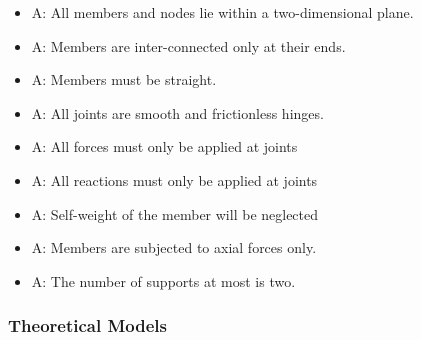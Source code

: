 \documentclass[12pt]{article}
\newcounter{assumpnum} %
\begin{document}
\begin{itemize}

\item{A\theassumpnum \label{planar}: All members and nodes lie within a two-dimensional plane.}

\item{A\theassumpnum \label{connection}: Members are inter-connected only at their ends.}
\item{A\theassumpnum \label{Staight_members}: Members must be straight.}
\item{A\theassumpnum \label{frictionless}: All joints are smooth and frictionless hinges.}
\item{A\theassumpnum \label{Force_at_joints}: All forces must only be applied at joints}
\item{A\theassumpnum \label{reaction_at_joints}: All reactions must only be applied at joints}
\item{A\theassumpnum \label{self_w}: Self-weight of the member will be neglected}
\item{A\theassumpnum \label{axial_f_members}: Members are subjected to axial forces only.}
\item{A\theassumpnum \label{maxsupport}: The number of supports at most is two.}



\end{itemize}

\subsubsection{Theoretical Models}\label{sec_theoretical}

\end{document}
